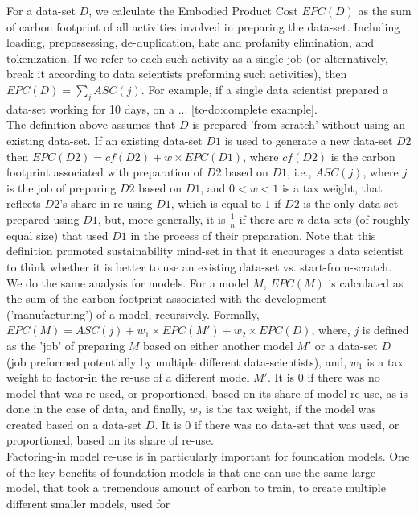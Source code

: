 For a data-set $D$, we calculate the Embodied Product Cost $EPC(D)$ as the sum of carbon footprint of all activities involved in preparing the data-set. Including loading, prepossessing, de-duplication, hate and profanity elimination, and tokenization. If we refer to each such activity as a single job (or alternatively, break it according to data scientists preforming such activities), then $EPC(D) = \sum_j ASC(j)$. For example, 
if a single data scientist prepared a data-set working for 10 days, on a ... [to-do:complete example].
\\
The definition above assumes that $D$ is prepared 'from scratch' without using an existing data-set. If an existing data-set $D1$ is used to generate a new data-set $D2$ then $EPC(D2) = cf(D2) + w \times EPC(D1) $, where $cf(D2)$ is the carbon footprint associated with preparation of $D2$ based on $D1$, i.e., $ASC(j)$, where $j$ is the job of preparing $D2$ based on $D1$, and $0 < w < 1$ is a tax weight, that reflects $D2$'s share in re-using $D1$, which is equal to $1$ if $D2$ is the only data-set prepared using $D1$, but, more generally, it is $\frac{1}{n}$ if there are $n$ data-sets (of roughly equal size) that used $D1$ in the process of their preparation. 
Note that this definition promoted sustainability mind-set in that it encourages a data scientist to think whether it is better to use an existing data-set vs. start-from-scratch. 
\\
We do the same analysis for models. For a model $M$, $EPC(M)$ is calculated as the sum of the carbon footprint associated with the development ('manufacturing') of a model, recursively. Formally, 
$EPC(M) = ASC(j) + w_1 \times EPC(M') + w_2 \times EPC(D)$, where, 
$j$ is defined as the 'job' of preparing $M$ based on either another model $M'$ or a data-set 
$D$ (job preformed potentially by multiple different data-scientists), and,  
$w_1$ is a tax weight to factor-in the re-use of a different model $M'$. It is $0$ if there was no model that was re-used, or proportioned, based on its share of model re-use, as is done in the case of data, and finally, $w_2$ is the tax weight, if the model was created based on a data-set $D$. It is $0$ if there was no data-set that was used, or proportioned, based on its share of re-use.
\\
Factoring-in model re-use is in particularly important for foundation models.
One of the key benefits of foundation models is that one can use
the same large model, that took a tremendous amount of carbon to train, to create multiple different smaller models, used for 
